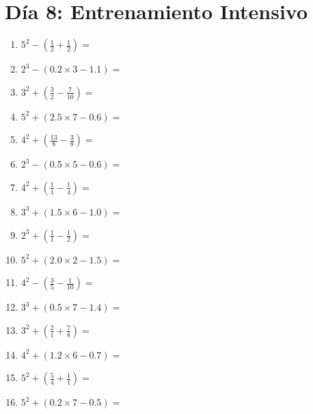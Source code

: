\documentclass[12pt]{article}
\begin{document}
\section*{Día 8: Entrenamiento Intensivo}
\begin{enumerate}
\item \large $ 5^{2} - (\frac{1}{2} + \frac{1}{2}) = $ \vspace{1.6cm}
\item \large $ 2^{3} - (0.2 \times 3 - 1.1) = $ \vspace{1.6cm}
\item \large $ 3^{2} + (\frac{3}{2} - \frac{7}{10}) = $ \vspace{1.6cm}
\item \large $ 5^{2} + (2.5 \times 7 - 0.6) = $ \vspace{1.6cm}
\item \large $ 4^{2} + (\frac{13}{8} - \frac{3}{8}) = $ \vspace{1.6cm}
\item \large $ 2^{3} - (0.5 \times 5 - 0.6) = $ \vspace{1.6cm}
\item \large $ 4^{2} + (\frac{1}{1} - \frac{1}{4}) = $ \vspace{1.6cm}
\item \large $ 3^{3} + (1.5 \times 6 - 1.0) = $ \vspace{1.6cm}
\item \large $ 2^{3} + (\frac{1}{1} - \frac{1}{2}) = $ \vspace{1.6cm}
\item \large $ 5^{2} + (2.0 \times 2 - 1.5) = $ \vspace{1.6cm}
\newpage
\item \large $ 4^{2} - (\frac{3}{5} - \frac{1}{10}) = $ \vspace{1.6cm}
\item \large $ 3^{3} + (0.5 \times 7 - 1.4) = $ \vspace{1.6cm}
\item \large $ 3^{2} + (\frac{2}{1} + \frac{7}{8}) = $ \vspace{1.6cm}
\item \large $ 4^{2} + (1.2 \times 6 - 0.7) = $ \vspace{1.6cm}
\item \large $ 5^{2} + (\frac{5}{4} + \frac{1}{1}) = $ \vspace{1.6cm}
\item \large $ 5^{2} + (0.2 \times 7 - 0.5) = $ \vspace{1.6cm}

\end{enumerate}
\end{document}

